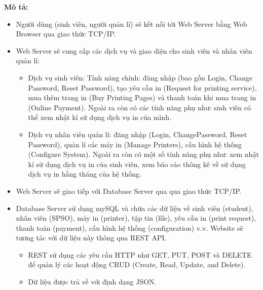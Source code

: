         \textbf{Mô tả:}
        \begin{itemize}
            \item Người dùng (sinh viên, người quản lí) sẽ  kết nối tới Web Server bằng Web Browser qua giao thức TCP/IP.
            \item Web Server sẽ cung cấp các dịch vụ và giao diện cho sinh viên và nhân viên quản lí:
            \begin{itemize}
                \item Dịch vụ sinh viên: Tính năng chính: đăng nhập (bao gồn Login, Change Password, Reset Password), tạo yêu cầu in (Request for printing service), mua thêm trang in (Buy Printing Pages) và thanh toán khi mua trang in (Online Payment). Ngoài ra còn có các tính năng phụ như: sinh viên có thể xem nhật kí sử dụng dịch vụ in của mình.
                \item Dịch vụ nhân viên quản lí: đăng nhập (Login, ChangePassword, Reset Password), quản lí các máy in (Manage Printers), cấu hình hệ thống (Configure System). Ngoài ra còn có một số tính năng phụ như: xem nhật kí sử dụng dịch vụ in của sinh viên, xem báo cáo thông kê về sử dụng dịch vụ in hằng tháng của hệ thống.
            \end{itemize}
            \item Web Server sẽ giao tiếp với Database Server qua qua giao thức TCP/IP.
            \item Database Server sử dụng mySQL và chứa các dữ liệu về sinh viên (student), nhân viên (SPSO), máy in (printer), tập tin (file), yêu cầu in (print request), thanh toán (payment), cấu hình hệ thống (configuration) v.v. Website sẽ tương tác với dữ liệu này thông qua REST API.
            \begin{itemize}
                \item REST sử dụng các yêu cầu HTTP như GET, PUT, POST và DELETE để quản lý các hoạt động CRUD (Create, Read, Update, and Delete).
                \item Dữ liệu được trả về với định dạng JSON.
            \end{itemize}
            
        \end{itemize}